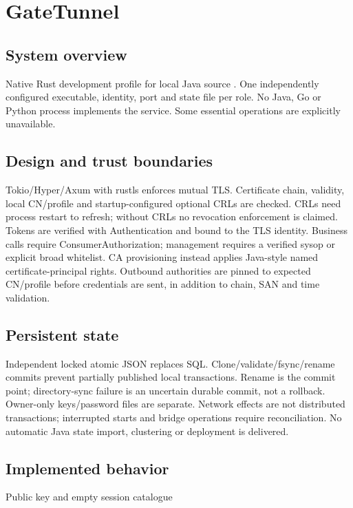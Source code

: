 \documentclass[a4paper]{arrowhead}
\begin{document}
\ArrowheadSetup
\section{GateTunnel}
\subsection{System overview}
Native Rust development profile for local Java source . One independently configured executable, identity, port and state file per role. No Java, Go or Python process implements the service. Some essential operations are explicitly unavailable.
\subsection{Design and trust boundaries}
Tokio/Hyper/Axum with rustls enforces mutual TLS. Certificate chain, validity, local CN/profile and startup-configured optional CRLs are checked. CRLs need process restart to refresh; without CRLs no revocation enforcement is claimed. Tokens are verified with Authentication and bound to the TLS identity. Business calls require ConsumerAuthorization; management requires a verified sysop or explicit broad whitelist. CA provisioning instead applies Java-style named certificate-principal rights. Outbound authorities are pinned to expected CN/profile before credentials are sent, in addition to chain, SAN and time validation.
\subsection{Persistent state}
Independent locked atomic JSON replaces SQL. Clone/validate/fsync/rename commits prevent partially published local transactions. Rename is the commit point; directory-sync failure is an uncertain durable commit, not a rollback. Owner-only keys/password files are separate. Network effects are not distributed transactions; interrupted starts and bridge operations require reconciliation. No automatic Java state import, clustering or deployment is delivered.
\subsection{Implemented behavior}
Public key and empty session catalogue
\end{document}
